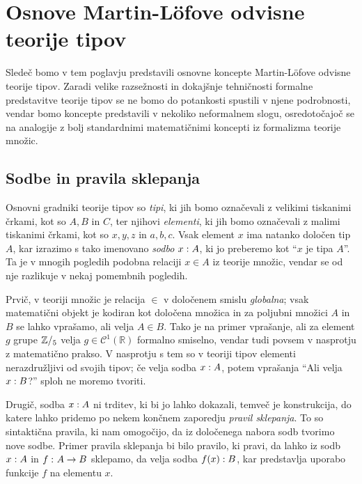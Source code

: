 \section{Osnove Martin-Löfove odvisne teorije tipov}

Sledeč \cite{rijke2022introduction} bomo v tem poglavju predstavili osnovne koncepte
Martin-Löfove odvisne teorije tipov. Zaradi velike razsežnosti in dokajšnje tehničnosti
formalne predstavitve teorije tipov se ne bomo do potankosti spustili v njene podrobnosti,
vendar bomo koncepte predstavili v nekoliko neformalnem slogu, osredotočajoč se na
analogije z bolj standardnimi matematičnimi koncepti iz formalizma teorije množic.

\subsection{Sodbe in pravila sklepanja}

Osnovni gradniki teorije tipov so \emph{tipi}, ki jih bomo označevali z velikimi tiskanimi
črkami, kot so \(A, B\) in \(C\), ter njihovi \emph{elementi}, ki jih bomo označevali
z malimi tiskanimi črkami, kot so \(x, y, z\) in \(a, b, c\). Vsak element \(x\) ima
natanko določen tip \(A\), kar izrazimo s tako imenovano \emph{sodbo}
\({x : A}\), ki jo preberemo kot ``\(x\) je tipa \(A\)''.
Ta je v mnogih pogledih podobna relaciji \(x \in A\) iz teorije množic, vendar se od
nje razlikuje v nekaj pomembnih pogledih.

Prvič, v teoriji množic je relacija \(\in\) v določenem smislu \emph{globalna};
vsak matematični objekt je kodiran kot določena množica in za poljubni množici \(A\) in
\(B\) se lahko vprašamo, ali velja \(A \in B\). Tako je na primer vprašanje, ali za element
\(g\) grupe \(\mathbb Z/_{5}\) velja \(g \in \mathcal{C}^{1}(\mathbb{R})\) formalno smiselno,
vendar tudi povsem v nasprotju z matematično prakso.
V nasprotju s tem so v teoriji tipov elementi nerazdružljivi od svojih tipov; če velja
sodba \({x : A}\), potem vprašanja ``Ali velja \({x : B}\)?''
sploh ne moremo tvoriti.

Drugič, sodba \({x : A}\) ni trditev, ki bi jo lahko dokazali, temveč je
konstrukcija, do katere lahko pridemo po nekem končnem zaporedju \emph{pravil sklepanja}.
To so sintaktična pravila, ki nam omogočijo, da iz določenega nabora
sodb tvorimo nove sodbe. Primer pravila sklepanja bi bilo pravilo, ki pravi, da
lahko iz sodb \({x : A}\) in \(f \,\colon A \to B\) sklepamo, da velja
sodba \({f(x) : B}\), kar predstavlja uporabo funkcije \(f\)
na elementu \(x\).

